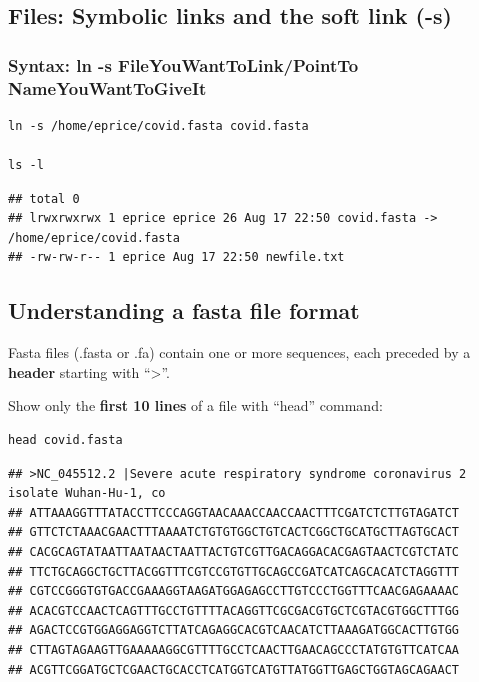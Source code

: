 \documentclass[
]{book}
\begin{document}
\hypertarget{files-symbolic-links-and-the-soft-link--s}{%
\subsection{Files: Symbolic links and the soft link (-s)}\label{files-symbolic-links-and-the-soft-link--s}}

\hypertarget{syntax-ln--s-fileyouwanttolinkpointto-nameyouwanttogiveit}{%
\subsubsection*{Syntax: ln -s FileYouWantToLink/PointTo NameYouWantToGiveIt}\label{syntax-ln--s-fileyouwanttolinkpointto-nameyouwanttogiveit}}

\begin{verbatim}
ln -s /home/eprice/covid.fasta covid.fasta

ls -l
\end{verbatim}

\begin{verbatim}
## total 0
## lrwxrwxrwx 1 eprice eprice 26 Aug 17 22:50 covid.fasta -> /home/eprice/covid.fasta 
## -rw-rw-r-- 1 eprice Aug 17 22:50 newfile.txt
\end{verbatim}

\hypertarget{understanding-a-fasta-file-format}{%
\subsection{Understanding a fasta file format}\label{understanding-a-fasta-file-format}}

Fasta files (.fasta or .fa) contain one or more sequences, each preceded by a \textbf{header} starting with ``\textgreater{}''.

Show only the \textbf{first 10 lines} of a file with ``head'' command:

\begin{verbatim}
head covid.fasta
\end{verbatim}

\begin{verbatim}
## >NC_045512.2 |Severe acute respiratory syndrome coronavirus 2 isolate Wuhan-Hu-1, co
## ATTAAAGGTTTATACCTTCCCAGGTAACAAACCAACCAACTTTCGATCTCTTGTAGATCT
## GTTCTCTAAACGAACTTTAAAATCTGTGTGGCTGTCACTCGGCTGCATGCTTAGTGCACT
## CACGCAGTATAATTAATAACTAATTACTGTCGTTGACAGGACACGAGTAACTCGTCTATC
## TTCTGCAGGCTGCTTACGGTTTCGTCCGTGTTGCAGCCGATCATCAGCACATCTAGGTTT
## CGTCCGGGTGTGACCGAAAGGTAAGATGGAGAGCCTTGTCCCTGGTTTCAACGAGAAAAC
## ACACGTCCAACTCAGTTTGCCTGTTTTACAGGTTCGCGACGTGCTCGTACGTGGCTTTGG
## AGACTCCGTGGAGGAGGTCTTATCAGAGGCACGTCAACATCTTAAAGATGGCACTTGTGG
## CTTAGTAGAAGTTGAAAAAGGCGTTTTGCCTCAACTTGAACAGCCCTATGTGTTCATCAA
## ACGTTCGGATGCTCGAACTGCACCTCATGGTCATGTTATGGTTGAGCTGGTAGCAGAACT
\end{verbatim}
\end{document}
